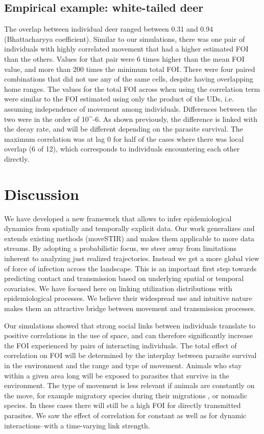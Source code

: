 \documentclass[letterpaper]{article}
\begin{document}
\subsection*{Empirical example: white-tailed deer}
The overlap between individual deer ranged between 0.31 and 0.94 (Bhattacharyya coefficient). 
Similar to our simulations, there was one pair of individuals with highly correlated movement that had a higher estimated FOI than the others. Values for that pair were 6 times higher than the mean FOI value, and more than 200 times the minimum total FOI. 
There were four paired combinations that did not use any of the same cells, despite having overlapping home ranges.
The values for the total FOI across when using the correlation term were similar to the FOI estimated using only the product of the UDs, i.e. assuming independence of movement among individuals. Differences between the two were in the order of 10^-6. 
As shown previously, the difference is linked with the decay rate, and will be different depending on the parasite survival. 
The maximum correlation was at lag 0 for half of the cases where there was local overlap (6 of 12), which corresponds to individuals encountering each other directly. 

 


\section*{Discussion}
We have developed a new framework that allows to infer epidemiological dynamics from spatially and temporally explicit data. Our work generalizes and extends existing methods (moveSTIR) and makes them applicable to more data streams. 
By adopting a probabilistic focus, we steer away from limitations inherent to analyzing just realized trajectories. Instead we get a more global view of force of infection across the landscape. This is an important first step towards predicting contact and transmission based on underlying spatial or temporal covariates.
We have focused here on linking utilization distributions with epidemiological processes. We believe their widespread use and intuitive nature makes them an attractive bridge between movement and transmission processes. 

% 
Our simulations showed that strong social links between individuals translate to positive correlations in the use of space, and can therefore significantly increase the FOI experienced by pairs of interacting individuals. 
The total effect of correlation on FOI will be determined by the interplay between parasite survival in the environment and the range and type of movement. Animals who stay within a given area long will be exposed to parasites that survive in the environment. The type of movement is less relevant if animals are constantly on the move, for example migratory species during their migrations \citep{Peacock2018}, or nomadic species. In these cases there will still be a high FOI for directly transmitted parasites.
We saw the effect of correlation for constant as well as for dynamic interactions--with a time-varying link strength.
\end{document}
